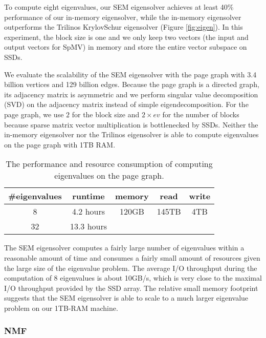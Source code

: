 To compute eight eigenvalues, our SEM eigensolver achieves at least 40\%
performance of our in-memory eigensolver, while the in-memory eigensolver
outperforms the Trilinos KrylovSchur eigensolver (Figure \ref{fig:eigen}).
In this experiment, the block size is one and we only keep two vectors
(the input and output vectors for SpMV) in memory and store the entire
vector subspace on SSDs.


%		

We evaluate the scalability of the SEM eigensolver with the page graph with 3.4 billion
vertices and 129 billion edges. Because the page graph is a directed graph,
its adjacency matrix is asymmetric and we perform singular value decomposition
(SVD) on the adjacency matrix instead of simple eigendecomposition. For the page
graph, we use $2$ for the block size and $2 \times ev$ for the number of blocks
because sparse matrix vector multiplication is bottlenecked by SSDs.
Neither the in-memory eigensolver nor the Trilinos eigensolver is able
to compute eigenvalues on the page graph with 1TB RAM.

\begin{table}
	\begin{center}
		\small
		\begin{tabular}{|c|c|c|c|c|}
			\hline
			\#eigenvalues & runtime & memory & read & write \\
			\hline
			8 & 4.2 hours & 120GB & 145TB & 4TB \\
			\hline
			32 & 13.3 hours &  &  & \\
			\hline
		\end{tabular}
		\normalsize
	\end{center}
	\caption{The performance and resource consumption of computing eigenvalues
	on the page graph.}
	\label{pg_ev}
\end{table}

The SEM eigensolver computes a fairly large number of eigenvalues within a reasonable
amount of time and consumes a fairly small amount of resources given the large
size of the eigenvalue problem.
The average I/O throughput during the computation of 8 eigenvalues is about
10GB/s, which is very close to the maximal I/O throughput provided by
the SSD array. The relative small memory footprint suggests that the SEM
eigensolver is able to scale to a much larger eigenvalue problem on our
1TB-RAM machine.

\subsubsection{NMF}
